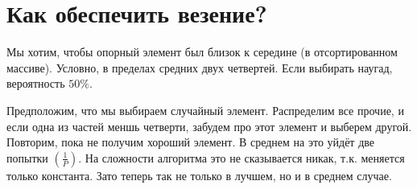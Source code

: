 \section*{Как обеспечить везение?}

Мы хотим, чтобы опорный элемент был близок к середине (в отсортированном массиве). Условно, в пределах средних двух четвертей. Если выбирать наугад, вероятность $50\%$.

Предположим, что мы выбираем случайный элемент. Распределим все прочие, и если одна из частей меншь четверти, забудем про этот элемент и выберем другой. Повторим, пока не получим хороший элемент. В среднем на это уйдёт две попытки $\left( \frac1P \right)$. На сложности алгоритма это не сказывается никак, т.к. меняется только константа. Зато теперь так не только в лучшем, но и в среднем случае.